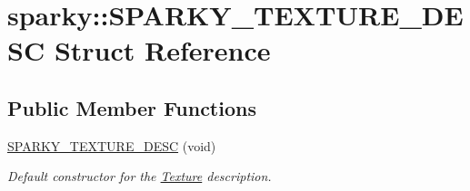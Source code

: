 \hypertarget{structsparky_1_1_s_p_a_r_k_y___t_e_x_t_u_r_e___d_e_s_c}{}\section{sparky\+:\+:S\+P\+A\+R\+K\+Y\+\_\+\+T\+E\+X\+T\+U\+R\+E\+\_\+\+D\+E\+SC Struct Reference}
\label{structsparky_1_1_s_p_a_r_k_y___t_e_x_t_u_r_e___d_e_s_c}
\subsection*{Public Member Functions}
\begin{DoxyCompactItemize}
\item 
\hyperlink{structsparky_1_1_s_p_a_r_k_y___t_e_x_t_u_r_e___d_e_s_c_afc7022cc0e79e582ccf982da69485f59}{S\+P\+A\+R\+K\+Y\+\_\+\+T\+E\+X\+T\+U\+R\+E\+\_\+\+D\+E\+SC} (void)
\begin{DoxyCompactList}\small\item\em Default constructor for the \hyperlink{classsparky_1_1_texture}{Texture} description. \end{DoxyCompactList}\end{DoxyCompactItemize}
